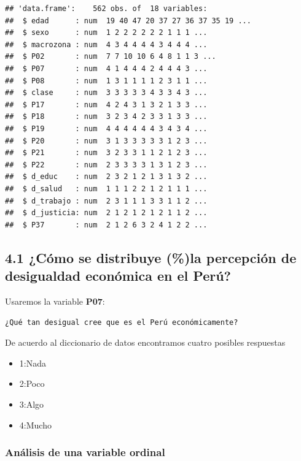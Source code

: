 \documentclass[
]{article}
\providecommand{\tightlist}{%
  \setlength{\itemsep}{0pt}\setlength{\parskip}{0pt}}
\begin{document}
\begin{verbatim}
## 'data.frame':    562 obs. of  18 variables:
##  $ edad      : num  19 40 47 20 37 27 36 37 35 19 ...
##  $ sexo      : num  1 2 2 2 2 2 2 1 1 1 ...
##  $ macrozona : num  4 3 4 4 4 4 3 4 4 4 ...
##  $ P02       : num  7 7 10 10 6 4 8 1 1 3 ...
##  $ P07       : num  4 1 4 4 4 2 4 4 4 3 ...
##  $ P08       : num  1 3 1 1 1 1 2 3 1 1 ...
##  $ clase     : num  3 3 3 3 3 4 3 3 4 3 ...
##  $ P17       : num  4 2 4 3 1 3 2 1 3 3 ...
##  $ P18       : num  3 2 3 4 2 3 3 1 3 3 ...
##  $ P19       : num  4 4 4 4 4 4 3 4 3 4 ...
##  $ P20       : num  3 1 3 3 3 3 3 1 2 3 ...
##  $ P21       : num  3 2 3 3 1 1 2 1 2 3 ...
##  $ P22       : num  2 3 3 3 3 1 3 1 2 3 ...
##  $ d_educ    : num  2 3 2 1 2 1 3 1 3 2 ...
##  $ d_salud   : num  1 1 1 2 2 1 2 1 1 1 ...
##  $ d_trabajo : num  2 3 1 1 1 3 3 1 1 2 ...
##  $ d_justicia: num  2 1 2 1 2 1 2 1 1 2 ...
##  $ P37       : num  2 1 2 6 3 2 4 1 2 2 ...
\end{verbatim}

\hypertarget{cuxf3mo-se-distribuye-la-percepciuxf3n-de-desigualdad-econuxf3mica-en-el-peruxfa}{%
\subsection{4.1 ¿Cómo se distribuye (\%)la percepción de desigualdad
económica en el
Perú?}\label{cuxf3mo-se-distribuye-la-percepciuxf3n-de-desigualdad-econuxf3mica-en-el-peruxfa}}

Usaremos la variable \textbf{P07}:

\texttt{¿Qué\ tan\ desigual\ cree\ que\ es\ el\ Perú\ económicamente?}

De acuerdo al diccionario de datos encontramos cuatro posibles
respuestas

\begin{itemize}
\tightlist
\item
  1:Nada
\item
  2:Poco
\item
  3:Algo
\item
  4:Mucho
\end{itemize}

\hypertarget{anuxe1lisis-de-una-variable-ordinal}{%
\subsubsection{\texorpdfstring{\textbf{Análisis de una variable
ordinal}}{Análisis de una variable ordinal}}\label{anuxe1lisis-de-una-variable-ordinal}}
\end{document}
